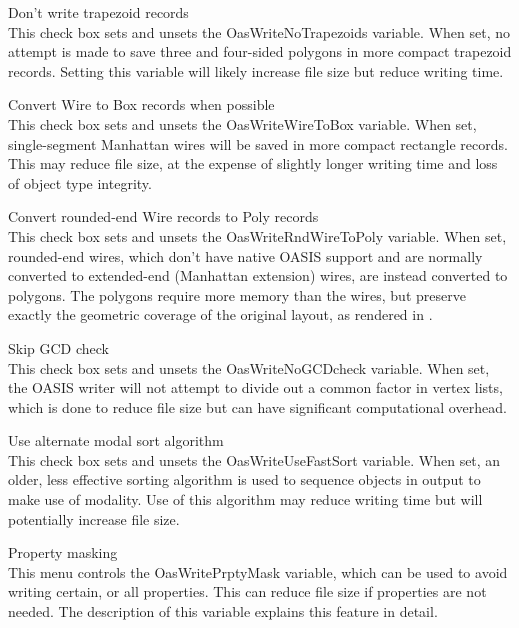 \begin{description}
\item{\cb Don't write trapezoid records}\\
This check box sets and unsets the {\et OasWriteNoTrapezoids}
variable.  When set, no attempt is made to save three and four-sided
polygons in more compact trapezoid records.  Setting this variable
will likely increase file size but reduce writing time.

\item{\cb Convert Wire to Box records when possible}\\
This check box sets and unsets the {\et OasWriteWireToBox} variable. 
When set, single-segment Manhattan wires will be saved in more compact
rectangle records.  This may reduce file size, at the expense of
slightly longer writing time and loss of object type integrity.

\item{\cb Convert rounded-end Wire records to Poly records}\\
This check box sets and unsets the {\et OasWriteRndWireToPoly}
variable.  When set, rounded-end wires, which don't have native OASIS
support and are normally converted to extended-end (Manhattan
extension) wires, are instead converted to polygons.  The polygons
require more memory than the wires, but preserve exactly the geometric
coverage of the original layout, as rendered in {\Xic}.

\item{\cb Skip GCD check}\\
This check box sets and unsets the {\et OasWriteNoGCDcheck} variable. 
When set, the OASIS writer will not attempt to divide out a common
factor in vertex lists, which is done to reduce file size but can have
significant computational overhead.

\item{\cb Use alternate modal sort algorithm}\\
This check box sets and unsets the {\et OasWriteUseFastSort} variable. 
When set, an older, less effective sorting algorithm is used to
sequence objects in output to make use of modality.  Use of this
algorithm may reduce writing time but will potentially increase file
size.

\item{\cb Property masking}\\
This menu controls the {\et OasWritePrptyMask} variable, which can be
used to avoid writing certain, or all properties.  This can reduce
file size if properties are not needed.  The description of this
variable explains this feature in detail.
\end{description}

